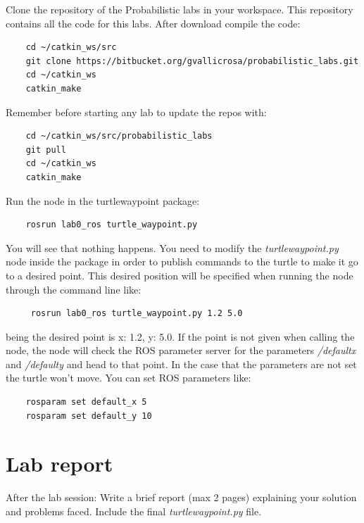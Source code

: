 \documentclass[a4paper,10pt]{article}
\begin{document}
\noindent
Clone the repository of the Probabilistic labs in your workspace. This repository contains all the code for this labs. After download compile the code:
\begin{verbatim}
    cd ~/catkin_ws/src
    git clone https://bitbucket.org/gvallicrosa/probabilistic_labs.git
    cd ~/catkin_ws
    catkin_make
\end{verbatim}
\noindent Remember before starting any lab to update the repos with:
\begin{verbatim}
    cd ~/catkin_ws/src/probabilistic_labs
    git pull
    cd ~/catkin_ws
    catkin_make
\end{verbatim}
\noindent
Run the node in the turtle{\textunderscore}waypoint package: 
\begin{verbatim}
    rosrun lab0_ros turtle_waypoint.py
\end{verbatim}
You will see that nothing happens. You need to modify the \emph{turtle{\textunderscore}waypoint.py} node inside the package in order to publish commands to the turtle to make it go to a desired point. This desired position will be specified when running the node through the command line like:
\begin{verbatim}
 	 rosrun lab0_ros turtle_waypoint.py 1.2 5.0
\end{verbatim}
being the desired point is x: 1.2, y: 5.0. If the point is not given when calling the node, the node will check the ROS parameter server for the parameters \emph{/default{\textunderscore}x} and \emph{/default{\textunderscore}y} and head to that point. In the case that the parameters are not set the turtle won't move. You can set ROS parameters like:
\begin{verbatim}
    rosparam set default_x 5
    rosparam set default_y 10
\end{verbatim}

\section{Lab report}

After the lab session: Write a brief report (max 2 pages) explaining your solution and problems faced. Include the final \emph{turtle{\textunderscore}waypoint.py} file.
\end{document}
